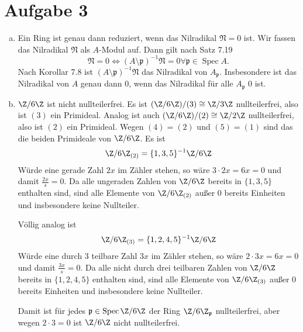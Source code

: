 \documentclass{article}
\newcommand{\spec}{\operatorname{Spec}}
\begin{document}
\section*{Aufgabe 3}
\begin{enumerate}[(a)]
    \item Ein Ring ist genau dann reduziert, wenn das Nilradikal $\mathfrak{N} = 0$ ist.
    Wir fassen das Nilradikal $\mathfrak{N}$ als $A$-Modul auf. Dann gilt nach Satz 7.19
    $$\mathfrak{N} = 0 \Leftrightarrow (A\setminus \mathfrak{p})^{-1} \mathfrak{N} = 0 \forall \mathfrak{p} \in \spec A.$$
    Nach Korollar 7.8 ist $(A\setminus \mathfrak{p})^{-1} \mathfrak{N}$ das Nilradikal von $A_\mathfrak{p}$.
    Insbesondere ist das Nilradikal von $A$ genau dann 0, wenn das Nilradikal für alle $A_\mathfrak{p}$ 0 ist.
    \item $\Z/6\Z$ ist nicht nullteilerfrei. Es ist $(\Z/6\Z)/(3) \cong \Z/3\Z$ nullteilerfrei, also ist $(3)$ ein Primideal.
    Analog ist auch $(\Z/6\Z)/(2) \cong \Z/2\Z$ nullteilerfrei, also ist $(2)$ ein Primideal. 
    Wegen $(4) = (2)$ und $(5) = (1)$ sind das die beiden Primideale von $\Z/6\Z$.
    Es ist
    $$\Z/6\Z_{(2)} = \{1,3,5\}^{-1}\Z/6\Z $$%
    Würde eine gerade Zahl $2x$ im Zähler stehen, so wäre $3 \cdot 2x = 6x = 0$ und damit $\frac{2x}{s} = 0$.
    Da alle ungeraden Zahlen von $\Z/6\Z$ bereits in $\{1,3,5\}$ enthalten sind, sind alle Elemente von $\Z/6\Z_{(2)}$ außer 0 
    bereits Einheiten und insbesondere keine Nullteiler.
    
    Völlig analog ist
    $$\Z/6\Z_{(3)} = \{1,2,4,5\}^{-1}\Z/6\Z $$%
    Würde eine durch 3 teilbare Zahl $3x$ im Zähler stehen, so wäre $2 \cdot 3x = 6x = 0$ und damit $\frac{3x}{s} = 0$.
    Da alle nicht durch drei teilbaren Zahlen von $\Z/6\Z$ bereits in $\{1,2,4,5\}$ enthalten sind, 
    sind alle Elemente von $\Z/6\Z_{(3)}$ außer 0 bereits Einheiten und insbesondere keine Nullteiler.

    Damit ist für jedes $\mathfrak{p} \in \spec \Z/6\Z$ der Ring $\Z/6\Z_\mathfrak{p}$ nullteilerfrei, aber
    wegen $2 \cdot 3 = 0$ ist $\Z/6\Z$ nicht nullteilerfrei.
\end{enumerate}
\end{document}
